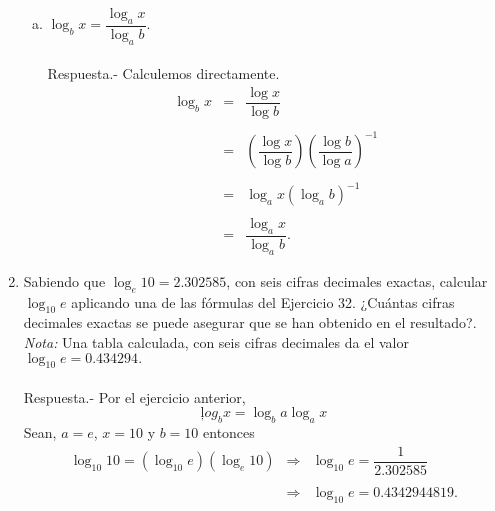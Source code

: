 \begin{enumerate}[\bfseries 1.]
\begin{enumerate}[(a)]
	    \item $\log_b x = \dfrac{\log_a x}{\log_a b}$.\\\\
		Respuesta.-\; Calculemos directamente.
		$$
		\begin{array}{rcl}
		    \log_b x &=& \dfrac{\log x}{\log b}\\\\
			     &=& \left(\dfrac{\log x}{\log b}\right)\left(\dfrac{\log b}{\log a}\right)^{-1}\\\\
			     &=& \log_a x(\log_a b)^{-1}\\\\
			     &=& \dfrac{\log_a x}{\log_a b}.
		\end{array}
		$$
		\vspace{.5cm}

	\end{enumerate}

    \item Sabiendo que $\log_e 10=2.302585$, con seis cifras decimales exactas, calcular $\log_{10} e$ aplicando una de las fórmulas del Ejercicio 32. ¿Cuántas cifras decimales exactas se puede asegurar que se han obtenido en el resultado?. \textit{Nota:} Una tabla calculada, con seis cifras decimales da el valor $\log_{10} e = 0.434294.$\\\\
	Respuesta.-\; Por el ejercicio anterior,
	$$ļog_b x = \log_b a \log_a x$$
	Sean, $a=e$, $x=10$ y $b=10$ entonces
	$$
	\begin{array}{rcl}
	    \log_{10} 10 = \left(\log_{10}e\right) \left(\log_e 10\right) &\Rightarrow& \log_{10} e = \dfrac{1}{2.302585}\\\\
									  &\Rightarrow&\log_{10} e = 0.4342944819.
	\end{array}
	$$
	\vspace{.5cm}


\end{enumerate}
